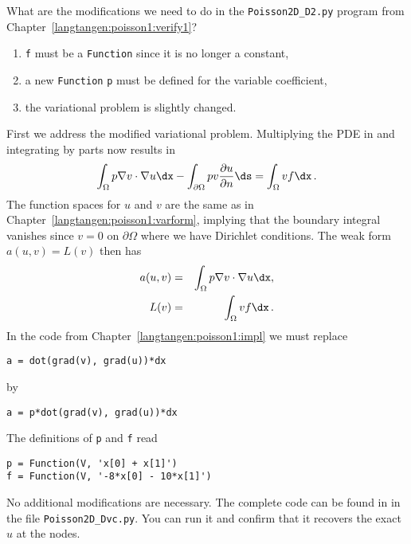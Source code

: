 What are the modifications we need to do in the {\fontsize{12pt}{12pt}\verb!Poisson2D_D2.py!} program
from Chapter~\ref{langtangen:poisson1:verify1}?
\begin{enumerate}
\item {\fontsize{12pt}{12pt}\texttt{f}} must be a {\fontsize{12pt}{12pt}\texttt{Function}} since it is no longer a constant,
\item a new {\fontsize{12pt}{12pt}\texttt{Function}} {\fontsize{12pt}{12pt}\texttt{p}} must be defined for the variable coefficient,
\item the variational problem is slightly changed.
\end{enumerate}
First we address the modified variational problem. Multiplying
the PDE in  and 
integrating by parts now results
in
\[ \int_\Omega p\nabla v\cdot\nabla u\dx - 
\int_{\partial\Omega} pv{\partial u\over
\partial n}\ds = \int_\Omega vf\dx\langtangenep\]
The function spaces for $u$ and $v$ are the same as in
Chapter~\ref{langtangen:poisson1:varform}, implying that the boundary integral
vanishes since $v=0$ on $\partial\Omega$ where we have Dirichlet conditions.
The weak form $a(u,v)=L(v)$ then has
\begin{eqnarray}
a(u,v) &=& \int_\Omega p\nabla v\cdot\nabla u\dx,\\
L(v) &=& \int_\Omega vf\dx\langtangenep
\end{eqnarray}
In the code from Chapter~\ref{langtangen:poisson1:impl} we must replace
\begin{Verbatim}[fontsize=\fontsize{10pt}{10pt},tabsize=8,baselinestretch=1.05,
fontfamily=tt,xleftmargin=7mm]
a = dot(grad(v), grad(u))*dx
\end{Verbatim}
\noindent
by
\begin{Verbatim}[fontsize=\fontsize{10pt}{10pt},tabsize=8,baselinestretch=1.05,
fontfamily=tt,xleftmargin=7mm]
a = p*dot(grad(v), grad(u))*dx
\end{Verbatim}
\noindent
The definitions of {\fontsize{12pt}{12pt}\texttt{p}} and {\fontsize{12pt}{12pt}\texttt{f}} read
\begin{Verbatim}[fontsize=\fontsize{10pt}{10pt},tabsize=8,baselinestretch=1.05,
fontfamily=tt,xleftmargin=7mm]
p = Function(V, 'x[0] + x[1]')
f = Function(V, '-8*x[0] - 10*x[1]')
\end{Verbatim}
\noindent
No additional modifications are necessary. The complete code can be
found in in the file {\fontsize{12pt}{12pt}\verb!Poisson2D_Dvc.py!}. You can run it and confirm
that it recovers the exact $u$ at the nodes.

